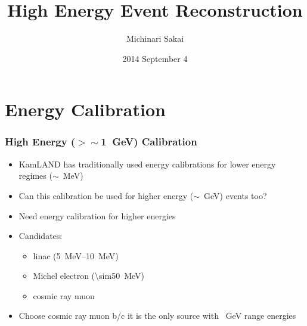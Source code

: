 \documentclass{beamer}
\title{High Energy Event Reconstruction}
\subtitle{}
\author[Michinari]{Michinari Sakai}
\institute{University of Hawaii}
\date{2014 September 4}
\begin{document}
\frame{\titlepage}

\section{Energy Calibration}

\begin{frame}
	\frametitle{High Energy ($>\sim$\SI{1}{\giga\electronvolt}) Calibration}
	\begin{itemize}
		\item KamLAND has traditionally used energy calibrations for lower
			energy regimes ($\sim$\SI{}{\mega\electronvolt})
		\item Can this calibration be used for higher energy
			($\sim$\SI{}{\giga\electronvolt}) events too?
		\item Need energy calibration for higher energies
		\item Candidates:\\
			\begin{itemize}
				\item linac
					(\SIrange[range-phrase=--]{5}{10}{\mega\electronvolt})
				\item Michel electron (\SI{\sim50}{\mega\electronvolt})
				\item cosmic ray muon
			\end{itemize}
		\item Choose cosmic ray muon b/c it is the only source with
			\SI{}{\giga\electronvolt} range
			energies
	\end{itemize}
\end{frame}
\end{document}
